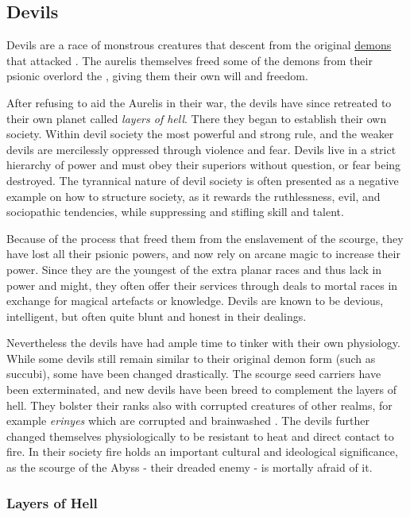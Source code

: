 \subsection{Devils}
\label{sec:Devils}

Devils are a race of monstrous creatures that descent from the original
\hyperref[sec:Demons]{demons} that attacked . The aurelis
themselves freed some of the demons from their psionic overlord the
, giving them their own will and freedom.

After refusing to aid the Aurelis in their war, the devils have since
retreated to their own planet called \emph{layers of hell}. There they began to
establish their own society. Within devil society the most powerful and strong
rule, and the weaker devils are mercilessly oppressed through violence and
fear. Devils live in a strict hierarchy of power and must obey their
superiors without question, or fear being destroyed. The tyrannical nature of
devil society is often presented as a negative example on how to structure
society, as it rewards the ruthlessness, evil, and sociopathic tendencies,
while suppressing and stifling skill and talent.

Because of the process that freed them from the enslavement of the scourge,
they have lost all their psionic powers, and now rely on arcane magic to
increase their power. Since they are the youngest of the extra planar races
and thus lack in power and might, they often offer their services through
deals to mortal races in exchange for magical artefacts or knowledge. Devils
are known to be devious, intelligent, but often quite blunt and honest in
their dealings.

Nevertheless the devils have had ample time to tinker with their own
physiology. While some devils still remain similar to their original demon
form (such as succubi), some have been changed drastically. The scourge seed
carriers have been exterminated, and new devils have been breed to complement
the layers of hell. They bolster their ranks also with corrupted creatures of
other realms, for example \emph{erinyes} which are corrupted and brainwashed
. The devils further changed themselves physiologically
to be resistant to heat and direct contact to fire. In their society fire
holds an important cultural and ideological significance, as the scourge of
the Abyss - their dreaded enemy - is mortally afraid of it.

\subsubsection{Layers of Hell}
\label{sec:Layers of Hell}

